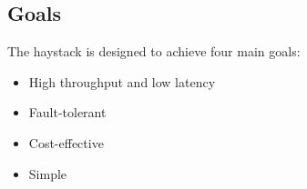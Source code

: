 \subsection{Goals}
The haystack is designed to achieve four main goals:
\begin{itemize}
  \item High throughput and low latency
  \item Fault-tolerant
  \item Cost-effective
  \item Simple
\end{itemize} 

